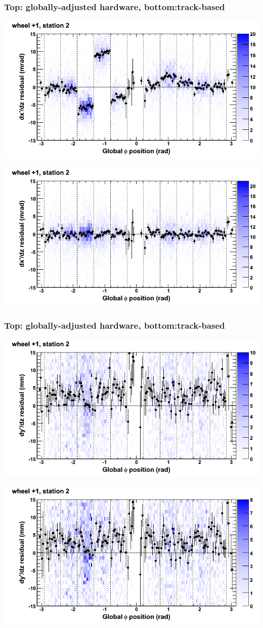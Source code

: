 \documentclass[compress]{beamer}
\begin{document}
\begin{frame}
\frametitle{Top: globally-adjusted hardware, bottom:track-based}
\includegraphics[width=0.7\linewidth]{NOV4_mapplots_HW/DTvsphi_st2whD_dxdz.png}

\includegraphics[width=0.7\linewidth]{NOV4_mapplots/DTvsphi_st2whD_dxdz.png}
\end{frame}

\begin{frame}
\frametitle{Top: globally-adjusted hardware, bottom:track-based}
\includegraphics[width=0.7\linewidth]{NOV4_mapplots_HW/DTvsphi_st2whD_dydz.png}

\includegraphics[width=0.7\linewidth]{NOV4_mapplots/DTvsphi_st2whD_dydz.png}
\end{frame}
\end{document}
